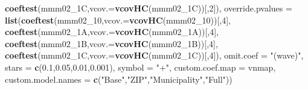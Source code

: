 \documentclass[
]{article}
\newenvironment{Shaded}{\begin{snugshade}}{\end{snugshade}}
\newcommand{\DataTypeTok}[1]{\textcolor[rgb]{0.13,0.29,0.53}{#1}}
\newcommand{\DecValTok}[1]{\textcolor[rgb]{0.00,0.00,0.81}{#1}}
\newcommand{\FloatTok}[1]{\textcolor[rgb]{0.00,0.00,0.81}{#1}}
\newcommand{\KeywordTok}[1]{\textcolor[rgb]{0.13,0.29,0.53}{\textbf{#1}}}
\newcommand{\NormalTok}[1]{#1}
\newcommand{\StringTok}[1]{\textcolor[rgb]{0.31,0.60,0.02}{#1}}
\begin{document}
\begin{Shaded}
\begin{Highlighting}[]
                             \KeywordTok{coeftest}\NormalTok{(mmm02_1C,}\DataTypeTok{vcov.=}\KeywordTok{vcovHC}\NormalTok{(mmm02_1C))[,}\DecValTok{2}\NormalTok{]),}
          \DataTypeTok{override.pvalues =} \KeywordTok{list}\NormalTok{(}\KeywordTok{coeftest}\NormalTok{(mmm02_}\DecValTok{10}\NormalTok{,}\DataTypeTok{vcov.=}\KeywordTok{vcovHC}\NormalTok{(mmm02_}\DecValTok{10}\NormalTok{))[,}\DecValTok{4}\NormalTok{],}
                                  \KeywordTok{coeftest}\NormalTok{(mmm02_1A,}\DataTypeTok{vcov.=}\KeywordTok{vcovHC}\NormalTok{(mmm02_1A))[,}\DecValTok{4}\NormalTok{],}
                                  \KeywordTok{coeftest}\NormalTok{(mmm02_1B,}\DataTypeTok{vcov.=}\KeywordTok{vcovHC}\NormalTok{(mmm02_1B))[,}\DecValTok{4}\NormalTok{],}
                                  \KeywordTok{coeftest}\NormalTok{(mmm02_1C,}\DataTypeTok{vcov.=}\KeywordTok{vcovHC}\NormalTok{(mmm02_1C))[,}\DecValTok{4}\NormalTok{]),}
          \DataTypeTok{omit.coef =} \StringTok{"(wave)"}\NormalTok{, }\DataTypeTok{stars =} \KeywordTok{c}\NormalTok{(}\FloatTok{0.1}\NormalTok{,}\FloatTok{0.05}\NormalTok{,}\FloatTok{0.01}\NormalTok{,}\FloatTok{0.001}\NormalTok{), }\DataTypeTok{symbol =} \StringTok{"+"}\NormalTok{,}
          \DataTypeTok{custom.coef.map =}\NormalTok{ vnmap, }
          \DataTypeTok{custom.model.names =} \KeywordTok{c}\NormalTok{(}\StringTok{"Base"}\NormalTok{,}\StringTok{"ZIP"}\NormalTok{,}\StringTok{"Municipality"}\NormalTok{,}\StringTok{"Full"}\NormalTok{))}
\end{Highlighting}
\end{Shaded}
\end{document}
